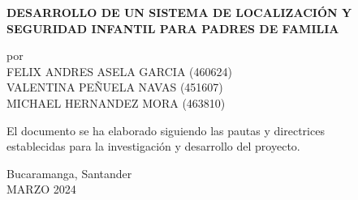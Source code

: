 \documentclass[12pt,onehalfspacing]{report}
\begin{document}
\thispagestyle{empty}

\begin{center}
{\large \MakeUppercase{\textbf{DESARROLLO DE UN SISTEMA DE LOCALIZACIÓN Y SEGURIDAD INFANTIL PARA PADRES DE FAMILIA}}}

\vspace{1in}

por \\
FELIX ANDRES ASELA GARCIA (460624)\\
VALENTINA PEÑUELA NAVAS (451607)\\
MICHAEL HERNANDEZ MORA (463810)

\vspace{1.5in}

El documento se ha elaborado siguiendo las pautas y directrices\\ establecidas para la investigación y desarrollo del proyecto.

\vspace{2in}

Bucaramanga, Santander\\       %
MARZO 2024                  %

\end{center}

\clearpage  %

\renewcommand{\contentsname}{Tabla de contenido}
\tableofcontents  %

\clearpage  %
\end{document}
